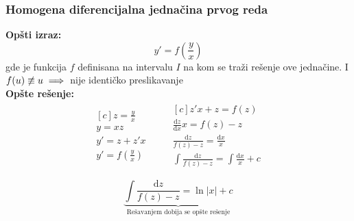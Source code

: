 \subsubsection{Homogena diferencijalna jednačina prvog reda}
\textbf{Opšti izraz:}
$$y' = f\left(\frac{y}{x}\right)$$
gde je funkcija $f$ definisana na intervalu $I$ na kom se traži rešenje ove jednačine. I $f(u)\centernot \equiv u \implies$ nije identičko preslikavanje\\
\textbf{Opšte rešenje:}
\begin{align*}
	\begin{aligned}[c]
		z = \frac{y}{x}\\
		y = xz\\
		y' = z+z'x\\
		y' = f\left(\frac{y}{x}\right)\\
	\end{aligned}
	\quad \quad
	\begin{aligned}[c]
		z'x+z = f(z)\\
		\frac{\mathrm{d}z}{\mathrm{d}x}x = f(z)-z\\
		\frac{\mathrm{d}z}{f(z)-z} = \frac{\mathrm{d}x}{x}\\
		\int \frac{\mathrm{d}z}{f(z)-z} = \int \frac{\mathrm{d}x}{x}+c\\
	\end{aligned}\\	
\end{align*}
$$\underbrace{\int \frac{\mathrm{d}z}{f(z)-z} = \ln|x|+c}_{\text{Rešavanjem dobija se opšte rešenje}}$$


